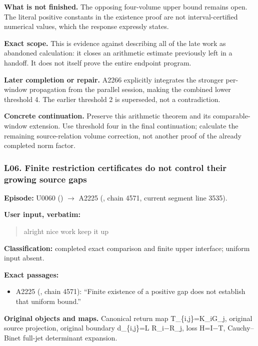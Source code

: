 \textbf{What is not finished.} The opposing four-volume upper bound
remains open. The literal positive constants in the existence proof are
not interval-certified numerical values, which the response expressly
states.

\textbf{Exact scope.} This is evidence against describing all of the
late work as abandoned calculation: it closes an arithmetic estimate
previously left in a handoff. It does not itself prove the entire
endpoint program.

\textbf{Later completion or repair.} A2266 explicitly integrates the
stronger per-window propagation from the parallel session, making the
combined lower threshold 4. The earlier threshold 2 is superseded, not a
contradiction.

\textbf{Concrete continuation.} Preserve this arithmetic theorem and its
comparable-window extension. Use threshold four in the final
continuation; calculate the remaining source-relation volume correction,
not another proof of the already completed norm factor.

\subsubsection{L06. Finite restriction certificates do not control their
growing source
gaps}\label{l06.-finite-restriction-certificates-do-not-control-their-growing-source-gaps}

\textbf{Episode:} U0060
(\protect{})
\allowbreak{}\ensuremath{→}\allowbreak{} A2225
(\protect{}, chain 4571,
current segment line 3535).

\textbf{User input, verbatim:}

\begin{quote}
alright nice work keep it up
\end{quote}

\textbf{Classification:} completed exact comparison and finite upper
interface; uniform input absent.

\textbf{Exact passages:}

\begin{itemize}
\tightlist
\item
  A2225 (\protect{}, chain
  4571): ``Finite existence of a positive gap does not establish that
  uniform bound.''
\end{itemize}

\textbf{Original objects and maps.} Canonical return map
T\_\{i,j\}=K\_iG\_j, original source projection, original boundary
d\_\{i,j\}=L R\_i\allowbreak{}\ensuremath{−}\allowbreak{}R\_j, loss
H=I\allowbreak{}\ensuremath{−}\allowbreak{}T, Cauchy--Binet full-jet
determinant expansion.

